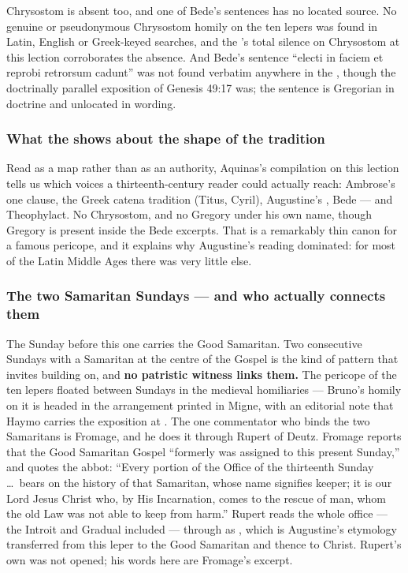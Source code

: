 Chrysostom is absent too, and one of Bede's sentences has no located source.
No genuine or pseudonymous
Chrysostom homily on the ten lepers was found in Latin, English or Greek-keyed
searches, and the 's total silence on Chrysostom at this
lection corroborates the absence. And Bede's sentence ``electi in faciem et
reprobi retrorsum cadunt'' was not found verbatim anywhere in the
, though the doctrinally parallel exposition of Genesis 49:17
was; the sentence is Gregorian in doctrine and unlocated in wording.

\subsubsection*{What the  shows about the shape of the tradition}

Read as a map rather than as an authority, Aquinas's compilation on this
lection tells us which voices a thirteenth-century reader could actually
reach: Ambrose's one clause, the Greek catena tradition (Titus, Cyril),
Augustine's , Bede --- and Theophylact. No Chrysostom, and no
Gregory under his own name, though Gregory is present inside the Bede
excerpts. That is a remarkably thin canon for a famous pericope, and it
explains why Augustine's reading dominated: for most of the Latin Middle Ages
there was very little else.

\subsubsection*{The two Samaritan Sundays --- and who actually connects them}

The Sunday before this one carries the Good Samaritan. Two consecutive
Sundays with a Samaritan at the centre of the Gospel is the kind of pattern
that invites building on, and \textbf{no patristic witness links them.} The pericope of the ten lepers floated between
Sundays in the medieval homiliaries --- Bruno's homily on it is headed
 in the arrangement printed in Migne, with
an editorial note that Haymo carries the exposition at .
The one commentator who binds the two Samaritans is Fromage, and he does it
through Rupert of Deutz. Fromage reports that the Good Samaritan Gospel
``formerly was assigned to this present Sunday,'' and quotes the abbot: ``Every
portion of the Office of the thirteenth Sunday \dots\ bears on the history of
that Samaritan, whose name signifies keeper; it is our Lord Jesus Christ who,
by His Incarnation, comes to the rescue of man, whom the old Law was not able
to keep from harm.'' Rupert reads the whole office --- the Introit and Gradual
included --- through  as , which is
Augustine's etymology transferred from this leper to the Good Samaritan and
thence to Christ. Rupert's own  was not opened; his
words here are Fromage's excerpt.

